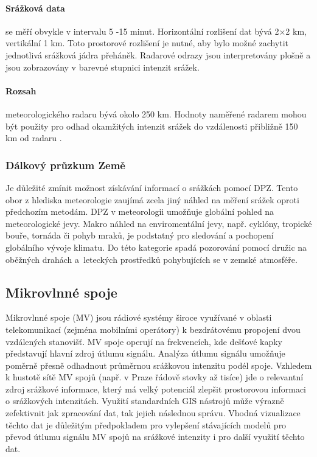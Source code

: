 \documentclass[a4paper,12pt,oneside]{report}
\begin{document}
\paragraph*{Srážková data} se měří obvykle v intervalu 5 -15
minut. Horizontální rozlišení dat bývá 2×2 km, vertikální 1 km. Toto
prostorové rozlišení je nutné, aby bylo možné zachytit jednotlivá
srážková jádra přeháněk. Radarové odrazy jsou interpretovány plošně a
jsou zobrazovány v barevné stupnici intenzit srážek.

\paragraph*{Rozsah} meteorologického radaru bývá okolo 250 km. Hodnoty
naměřené radarem mohou být použity pro odhad okamžitých intenzit
srážek do vzdálenosti přibližně 150 km od radaru \cite{kohout}.

\subsubsection{Dálkový průzkum Země}
Je důležité zmínit možnost získávání informací o srážkách pomocí
  \acs{DPZ}. Tento obor z hlediska meteorologie zaujímá zcela jiný
náhled na měření srážek oproti předchozím metodám. \acs{DPZ} v
meteorologii umožňuje globální pohled na meteorologické jevy. Makro
náhled na enviromentální jevy, např. cyklóny, tropické bouře, tornáda
či pohyb mraků, je podstatný pro sledování a pochopení globálního
vývoje klimatu. Do této kategorie spadá pozorování pomocí družic na
oběžných drahách a~leteckých prostředků pohybujících se v zemské
atmosféře.


\subsection{Mikrovlnné spoje}

Mikrovlnné spoje (MV) jsou rádiové systémy široce využívané v oblasti
telekomunikací (zejména mobilními operátory) k bezdrátovému propojení
dvou vzdálených stanovišť. MV spoje operují na frekvencích, kde
dešťové kapky představují hlavní zdroj útlumu signálu. Analýza útlumu
signálu umožňuje poměrně přesně odhadnout průměrnou srážkovou
intenzitu podél spoje. Vzhledem k hustotě sítě MV spojů (např. v Praze
řádově stovky až tisíce) jde o relevantní zdroj srážkové informace,
který má velký potenciál zlepšit prostorovou informaci o srážkových
intenzitách. Využití standardních GIS nástrojů může výrazně
zefektivnit jak zpracování dat, tak jejich následnou správu.  Vhodná
vizualizace těchto dat je důležitým předpokladem pro vylepšení
stávajících modelů pro převod útlumu signálu MV spojů na srážkové
intenzity i pro další využití těchto dat.
\end{document}
